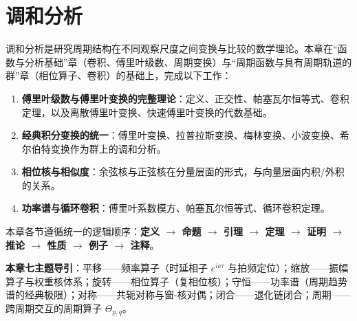 \chapter{调和分析}
\label{chap:harmonic}
\label{chap:harmonic-analysis}

\begin{remark}[本章定位]\label{rem:harmonic_chapter_positioning}
调和分析是研究周期结构在不同观察尺度之间变换与比较的数学理论。本章在“函数与分析基础”章（卷积、傅里叶级数、周期变换）与“周期函数与具有周期轨道的群”章（相位算子、卷积）的基础上，完成以下工作：
\begin{enumerate}[label=(\arabic*)]
    \item \textbf{傅里叶级数与傅里叶变换的完整理论}：定义、正交性、帕塞瓦尔恒等式、卷积定理，以及离散傅里叶变换、快速傅里叶变换的代数基础。
    \item \textbf{经典积分变换的统一}：傅里叶变换、拉普拉斯变换、梅林变换、小波变换、希尔伯特变换作为群上的调和分析。
    \item \textbf{相位核与相似度}：余弦核与正弦核在分量层面的形式，与向量层面内积/外积的关系。
    \item \textbf{功率谱与循环卷积}：傅里叶系数模方、帕塞瓦尔恒等式、循环卷积定理。
\end{enumerate}
本章各节遵循统一的逻辑顺序：\textbf{定义 $\to$ 命题 $\to$ 引理 $\to$ 定理 $\to$ 证明 $\to$ 推论 $\to$ 性质 $\to$ 例子 $\to$ 注释}。

\textbf{本章七主题导引}：平移——频率算子（时延相子 $e^{i\nu\tau}$ 与拍频定位）；缩放——振幅算子与权重核体系；旋转——相位算子（复相位核）；守恒——功率谱（周期趋势谱的经典极限）；对称——共轭对称与窗-核对偶；闭合——退化链闭合；周期——跨周期交互的周期算子 $\Theta_{p,q}$。
\end{remark}

